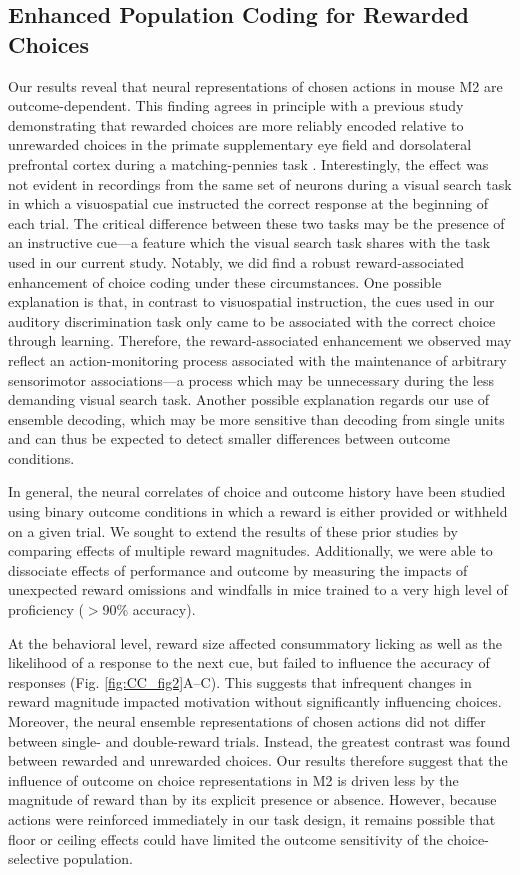 \subsection*{Enhanced Population Coding for Rewarded Choices}
Our results reveal that neural representations of chosen actions in mouse M2 are outcome-dependent. This finding agrees in principle with a previous study demonstrating that rewarded choices are more reliably encoded relative to unrewarded choices in the primate supplementary eye field and dorsolateral prefrontal cortex during a matching-pennies task \citep{donahue2013cortical}. Interestingly, the effect was not evident in recordings from the same set of neurons during a visual search task in which a visuospatial cue instructed the correct response at the beginning of each trial. The critical difference between these two tasks may be the presence of an instructive cue---a feature which the visual search task shares with the task used in our current study. Notably, we did find a robust reward-associated enhancement of choice coding under these circumstances. One possible explanation is that, in contrast to visuospatial instruction, the cues used in our auditory discrimination task only came to be associated with the correct choice through learning. Therefore, the reward-associated enhancement we observed may reflect an action-monitoring process associated with the maintenance of arbitrary sensorimotor associations---a process which may be unnecessary during the less demanding visual search task. Another possible explanation regards our use of ensemble decoding, which may be more sensitive than decoding from single units and can thus be expected to detect smaller differences between outcome conditions.

In general, the neural correlates of choice and outcome history have been studied using binary outcome conditions in which a reward is either provided or withheld on a given trial. We sought to extend the results of these prior studies by comparing effects of multiple reward magnitudes. Additionally, we were able to dissociate effects of performance and outcome by measuring the impacts of unexpected reward omissions and windfalls in mice trained to a very high level of proficiency ($>$90\% accuracy).

At the behavioral level, reward size affected consummatory licking as well as the likelihood of a response to the next cue, but failed to influence the accuracy of responses (Fig. \ref{fig:CC_fig2}A--C). This suggests that infrequent changes in reward magnitude impacted motivation without significantly influencing choices. Moreover, the neural ensemble representations of chosen actions did not differ between single- and double-reward trials. Instead, the greatest contrast was found between rewarded and unrewarded choices. Our results therefore suggest that the influence of outcome on choice representations in M2 is driven less by the magnitude of reward than by its explicit presence or absence. However, because actions were reinforced immediately in our task design, it remains possible that floor or ceiling effects could have limited the outcome sensitivity of the choice-selective population.

